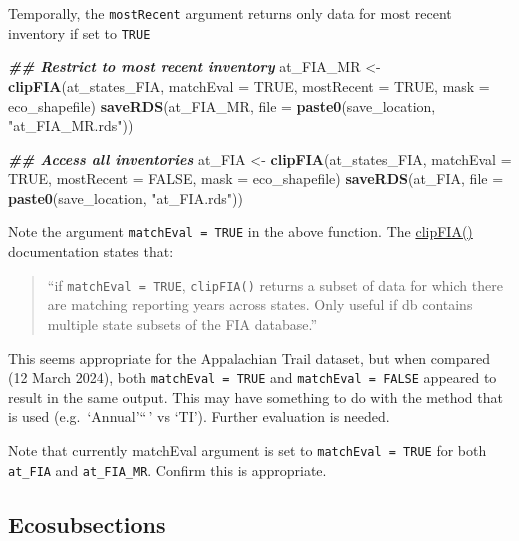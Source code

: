 \documentclass[
]{book}
\newenvironment{Shaded}{\begin{snugshade}}{\end{snugshade}}
\newcommand{\AttributeTok}[1]{\textcolor[rgb]{0.13,0.29,0.53}{#1}}
\newcommand{\ConstantTok}[1]{\textcolor[rgb]{0.56,0.35,0.01}{#1}}
\newcommand{\DocumentationTok}[1]{\textcolor[rgb]{0.56,0.35,0.01}{\textbf{\textit{#1}}}}
\newcommand{\FunctionTok}[1]{\textcolor[rgb]{0.13,0.29,0.53}{\textbf{#1}}}
\newcommand{\NormalTok}[1]{#1}
\newcommand{\OtherTok}[1]{\textcolor[rgb]{0.56,0.35,0.01}{#1}}
\newcommand{\StringTok}[1]{\textcolor[rgb]{0.31,0.60,0.02}{#1}}
\begin{document}
Temporally, the \texttt{mostRecent} argument returns only data for most recent inventory if set to \texttt{TRUE}

\begin{Shaded}
\begin{Highlighting}[]
\DocumentationTok{\#\# Restrict to most recent inventory}
\NormalTok{at\_FIA\_MR }\OtherTok{\textless{}{-}} \FunctionTok{clipFIA}\NormalTok{(at\_states\_FIA, }\AttributeTok{matchEval =} \ConstantTok{TRUE}\NormalTok{, }\AttributeTok{mostRecent =} \ConstantTok{TRUE}\NormalTok{, }\AttributeTok{mask =}\NormalTok{ eco\_shapefile)}
\FunctionTok{saveRDS}\NormalTok{(at\_FIA\_MR, }\AttributeTok{file =} \FunctionTok{paste0}\NormalTok{(save\_location, }\StringTok{"at\_FIA\_MR.rds"}\NormalTok{))}

\DocumentationTok{\#\# Access all inventories}
\NormalTok{at\_FIA }\OtherTok{\textless{}{-}} \FunctionTok{clipFIA}\NormalTok{(at\_states\_FIA, }\AttributeTok{matchEval =} \ConstantTok{TRUE}\NormalTok{, }\AttributeTok{mostRecent =} \ConstantTok{FALSE}\NormalTok{, }\AttributeTok{mask =}\NormalTok{ eco\_shapefile)}
\FunctionTok{saveRDS}\NormalTok{(at\_FIA, }\AttributeTok{file =} \FunctionTok{paste0}\NormalTok{(save\_location, }\StringTok{"at\_FIA.rds"}\NormalTok{))}
\end{Highlighting}
\end{Shaded}

Note the argument \texttt{matchEval\ =\ TRUE} in the above function. The \href{https://rdrr.io/cran/rFIA/man/clipFIA.html}{clipFIA()} documentation states that:

\begin{quote}
``if \texttt{matchEval\ =\ TRUE}, \texttt{clipFIA()} returns a subset of data for which there are matching reporting years across
states. Only useful if db contains multiple state subsets of the FIA database.''
\end{quote}

This seems appropriate for the Appalachian Trail dataset, but when compared (12 March 2024), both \texttt{matchEval\ =\ TRUE} and \texttt{matchEval\ =\ FALSE} appeared to result in the same output. This may have something to do with the method that is used (e.g.~`Annual'``\,' vs `TI'). Further evaluation is needed.

Note that currently matchEval argument is set to \texttt{matchEval\ =\ TRUE} for both \texttt{at\_FIA} and \texttt{at\_FIA\_MR}. Confirm this is appropriate.

\hypertarget{ecosubsections}{%
\subsection{Ecosubsections}\label{ecosubsections}}
\end{document}
